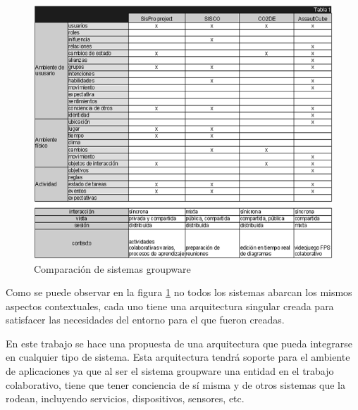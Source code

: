 \begin{figure}[h!]
  \centering
    \includegraphics[scale=0.9]{images/groupware}
  \caption{Comparaci\'on de sistemas groupware}
  \label{cmp:gw}
\end{figure}

Como se puede observar en la figura \ref{cmp:gw} no todos los sistemas abarcan los mismos aspectos contextuales, cada uno tiene una arquitectura singular creada para satisfacer las necesidades del entorno para el que fueron creadas. 

En este trabajo se hace una propuesta de una arquitectura que pueda integrarse en cualquier tipo de sistema. Esta arquitectura tendr\'a soporte para el ambiente de aplicaciones ya que al ser el sistema groupware una entidad en el trabajo colaborativo, tiene que tener conciencia de s\'i misma y de otros sistemas que la rodean, incluyendo servicios, dispositivos, sensores, etc.

